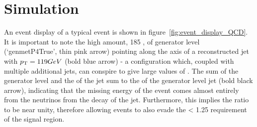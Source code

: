 
\section{Simulation}
An event display of a typical event is shown in figure~\ref{fig:event_display_QCD}.
It is important to note the high amount, 185 \gev, of generator level
\met (`genmetP4True', thin pink arrow) pointing along the axis of a reconstructed
jet with ${p_{\text T}} = 119 GeV$ (bold blue arrow) - a configuration which,
coupled with multiple additional jets, can conspire to give
large values of \alphat. The sum of the generator level \met and
the \Pt of the jet sum to the \Pt of the generator level jet (bold black arrow),
indicating that the missing energy of the event comes almost entirely from the
neutrinos from the decay of the jet. Furthermore, this implies the ratio
\mhtmet to be near unity, therefore allowing events to also evade the \mhtmet <
1.25 requirement of the signal region.




